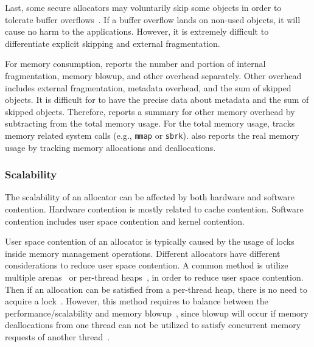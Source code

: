  Last, some secure allocators may voluntarily skip some objects in order to tolerate buffer overflows~\citep{DieHard, DieHarder, Guarder}. If a buffer overflow lands on non-used objects, it will cause no harm to the applications. However, it is extremely difficult to differentiate explicit skipping and external fragmentation. 


For memory consumption, \MP{} reports the number and portion of internal fragmentation, memory blowup, and other overhead separately. Other overhead includes external fragmentation, metadata overhead, and the sum of skipped objects. It is difficult for \MP{} to have the precise data about metadata and the sum of skipped objects. Therefore, \MP{} reports a summary for other memory overhead by subtracting from the total memory usage. For the total memory usage, \MP{} tracks memory related system calls (e.g., \texttt{mmap} or \texttt{sbrk}). \MP{} also reports the real memory usage by tracking memory allocations and deallocations.  


\subsubsection{Scalability} 
\label{sec:scalability}

The scalability of an allocator can be affected by both hardware and software contention. Hardware contention is mostly related to cache contention. Software contention includes user space contention and kernel contention. 

User space contention of an allocator is typically caused by the usage of locks inside memory management operations. Different allocators have different considerations to reduce user space contention. A common method is utilize multiple arenas~\citep{dlmalloc} or per-thread heaps~\citep{Hoard}, in order to reduce user space contention. Then if an allocation can be satisfied from a per-thread heap, there is no need to acquire a lock~\citep{tcmalloc, jemalloc}. However, this method requires to balance between the performance/scalability and memory blowup~\citep{Hoard}, since blowup will occur if memory deallocations from one thread can not be utilized to satisfy concurrent memory requests of another thread~\cite{Hoard}. 


